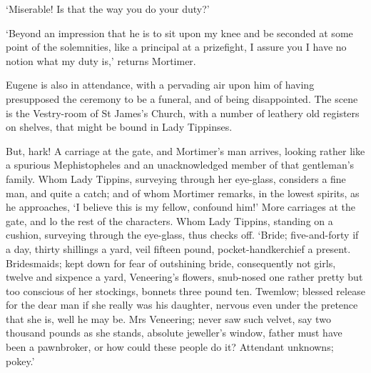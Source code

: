 ‘Miserable! Is that the way you do your duty?’

‘Beyond an impression that he is to sit upon my knee and be seconded
at some point of the solemnities, like a principal at a prizefight, I
assure you I have no notion what my duty is,’ returns Mortimer.

Eugene is also in attendance, with a pervading air upon him of having
presupposed the ceremony to be a funeral, and of being disappointed. The
scene is the Vestry-room of St James’s Church, with a number of leathery
old registers on shelves, that might be bound in Lady Tippinses.

But, hark! A carriage at the gate, and Mortimer’s man arrives, looking
rather like a spurious Mephistopheles and an unacknowledged member
of that gentleman’s family. Whom Lady Tippins, surveying through her
eye-glass, considers a fine man, and quite a catch; and of whom Mortimer
remarks, in the lowest spirits, as he approaches, ‘I believe this is my
fellow, confound him!’ More carriages at the gate, and lo the rest of
the characters. Whom Lady Tippins, standing on a cushion, surveying
through the eye-glass, thus checks off. ‘Bride; five-and-forty if a
day, thirty shillings a yard, veil fifteen pound, pocket-handkerchief
a present. Bridesmaids; kept down for fear of outshining bride,
consequently not girls, twelve and sixpence a yard, Veneering’s flowers,
snub-nosed one rather pretty but too conscious of her stockings, bonnets
three pound ten. Twemlow; blessed release for the dear man if she really
was his daughter, nervous even under the pretence that she is, well he
may be. Mrs Veneering; never saw such velvet, say two thousand pounds
as she stands, absolute jeweller’s window, father must have been a
pawnbroker, or how could these people do it? Attendant unknowns; pokey.’

